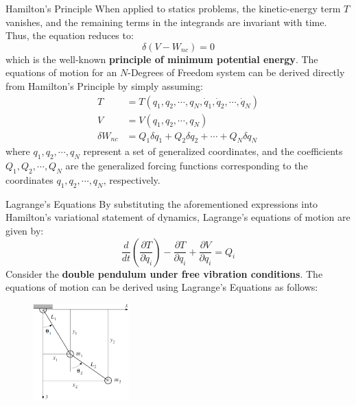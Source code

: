 \documentclass{beamer}
\begin{document}
\begin{frame}{Hamilton's Principle}
  When applied to statics problems, the kinetic-energy term \( T \) vanishes, and the remaining terms in the integrands are invariant with time. Thus, the equation reduces to:
  \[
  \delta (V - W_{nc}) = 0
  \]
  which is the well-known \textbf{principle of minimum potential energy}. The equations of motion for an \(N\)-Degrees of Freedom system can be derived directly from Hamilton's Principle by simply assuming:
   \begin{align*}
    T &= T(q_1, q_2, \cdots, q_N, \dot{q}_1, \dot{q}_2, \cdots, \dot{q}_N)\\
    V &= V(q_1, q_2, \cdots, q_N) \\
    \delta W_{nc} &= Q_1 \delta q_1 + Q_2 \delta q_2 + \cdots + Q_N \delta q_N 
  \end{align*}
  where \(q_1, q_2, \cdots, q_N\) represent a set of generalized coordinates, and the coefficients \(Q_1, Q_2, \cdots, Q_N\) are the generalized forcing functions corresponding to the coordinates \(q_1, q_2, \cdots, q_N\), respectively.
\end{frame}

\begin{frame}{Lagrange's Equations}
  By substituting the aforementioned expressions into Hamilton's variational statement of dynamics, Lagrange's equations of motion are given by:
  \[
  \frac{d}{dt} \left( \frac{\partial T}{\partial \dot{q}_i} \right) - \frac{\partial T}{\partial q_i} + \frac{\partial V}{\partial q_i} = Q_i
  \]
  Consider the \textbf{double pendulum under free vibration conditions}\cite{1977Dynamics}. The equations of motion can be derived using Lagrange's Equations as follows:
  \begin{figure}[htpb]
    \centering
    \includegraphics[width=0.33\textwidth]{double_.png}
  \end{figure}
\end{frame}
\end{document}

